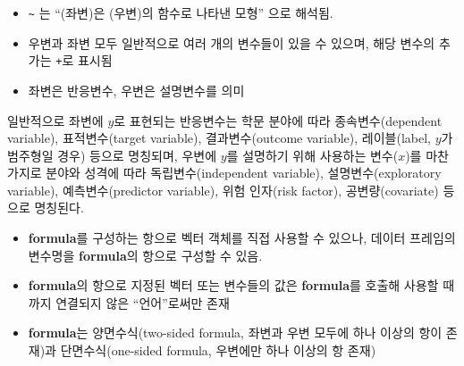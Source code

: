 \documentclass[
  11pt,
]{krantz}
\makeatletter
\providecommand{\tightlist}{%
  \setlength{\itemsep}{0pt}\setlength{\parskip}{0pt}}
\newenvironment{kframe}{%
\medskip{}
\setlength{\fboxsep}{.8em}
 \def\at@end@of@kframe{}%
 \ifinner\ifhmode%
  \def\at@end@of@kframe{\end{minipage}}%
  \begin{minipage}{\columnwidth}%
 \fi\fi%
 \def\FrameCommand##1{\hskip\@totalleftmargin \hskip-\fboxsep
 \colorbox{shadecolor}{##1}\hskip-\fboxsep
     \hskip-\linewidth \hskip-\@totalleftmargin \hskip\columnwidth}%
 \MakeFramed {\advance\hsize-\width
   \@totalleftmargin\z@ \linewidth\hsize
   \@setminipage}}%
 {\par\unskip\endMakeFramed%
 \at@end@of@kframe}
\newenvironment{rmdblock}[1]
  {
  \begin{itemize}
  \renewcommand{\labelitemi}{
    \raisebox{-.7\height}[0pt][0pt]{
      {\setkeys{Gin}{width=3em,keepaspectratio}\texttt{[image: images/\#1]}}
    }
  }
  \setlength{\fboxsep}{1em}
  \begin{kframe}
  \item
  }
  {
  \end{kframe}
  \end{itemize}
  }
\newenvironment{rmdtip}
  {\begin{rmdblock}{tip}}
  {\end{rmdblock}}
\makeatother
\begin{document}
\begin{itemize}
\tightlist
\item
  \texttt{\textasciitilde{}} 는 ``(좌변)은 (우변)의 함수로 나타낸 모형'' 으로 해석됨.
\item
  우변과 좌변 모두 일반적으로 여러 개의 변수들이 있을 수 있으며, 해당 변수의 추가는 \texttt{+}로 표시됨
\item
  좌변은 반응변수, 우변은 설명변수를 의미
\end{itemize}

\footnotesize

\begin{rmdtip}
일반적으로 좌변에 \(y\)로 표현되는 반응변수는 학문 분야에 따라 종속변수(dependent variable), 표적변수(target variable), 결과변수(outcome variable),
레이블(label, \(y\)가 범주형일 경우) 등으로 명칭되며, 우변에 \(y\)를 설명하기 위해 사용하는 변수(\(x\))를 마찬가지로 분야와 성격에 따라 독립변수(independent variable),
설명변수(exploratory variable), 예측변수(predictor variable), 위험 인자(risk factor), 공변량(covariate) 등으로 명칭된다.
\end{rmdtip}

\normalsize

\begin{itemize}
\tightlist
\item
  \textbf{formula}를 구성하는 항으로 벡터 객체를 직접 사용할 수 있으나, 데이터 프레임의 변수명을 \textbf{formula}의 항으로 구성할 수 있음.
\item
  \textbf{formula}의 항으로 지정된 벡터 또는 변수들의 값은 \textbf{formula}를 호출해 사용할 때 까지 연결되지 않은 ``언어''로써만 존재
\item
  \textbf{formula}는 양면수식(two-sided formula, 좌변과 우변 모두에 하나 이상의 항이 존재)과 단면수식(one-sided formula, 우변에만 하나 이상의 항 존재)
\end{itemize}

\footnotesize
\end{document}
